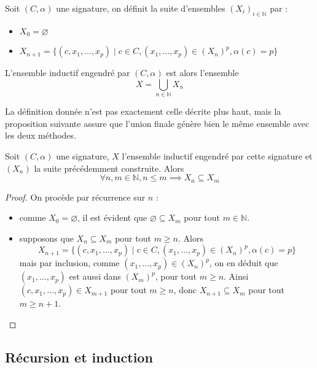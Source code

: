 \begin{definition}
  Soit $(C,\alpha)$ une signature, on définit la suite d'ensembles
  $(X_i)_{i\in\mathbb N}$ par :
  \begin{itemize}
  \item $X_0 = \varnothing$
  \item $X_{n+1} = \{ (c,x_1,\ldots,x_p) \mid c\in C, (x_1,\ldots,x_p)\in (X_n)^p,
    \alpha(c) = p \}$
  \end{itemize}

  L'ensemble inductif engendré par $(C,\alpha)$ est alors l'ensemble
  $$X = \bigcup_{n\in \mathbb N} X_n$$
\end{definition}

La définition donnée n'est pas exactement celle décrite plus haut, mais la
proposition suivante assure que l'union finale génère bien le même ensemble
avec les deux méthodes.

\begin{proposition}
  Soit $(C,\alpha)$ une signature, $X$ l'ensemble inductif engendré par cette
  signature et $(X_n)$ la suite précédemment construite. Alors
  $$\forall n,m \in \mathbb N, n \leq m \implies X_n \subseteq X_m$$
\end{proposition}

\begin{proof}
  On procède par récurrence sur $n$ :
  \begin{itemize}
  \item comme $X_0 = \varnothing$, il est évident que
    $\varnothing \subseteq X_m$ pour tout $m \in\mathbb N$.
  \item supposons que $X_n \subseteq X_m$ pour tout $m \geq n$. Alors
    $$X_{n+1} = \{(c,x_1,\ldots,x_p)\mid c\in C, (x_1,\ldots,x_p)\in(X_n)^p,
    \alpha(c) = p\}$$
    mais par inclusion, comme $(x_1,\ldots,x_p)\in (X_n)^p$, on en déduit que
    $(x_1,\ldots,x_p)$ est aussi dans $(X_m)^p$, pour tout $m \geq n$. Ainsi
    $(c,x_1,\ldots,x_p) \in X_{m+1}$ pour tout $m \geq n$, donc
    $X_{n+1}\subseteq X_m$ pour tout $m \geq n+1$.
  \end{itemize}
\end{proof}

\subsection{Récursion et induction}

